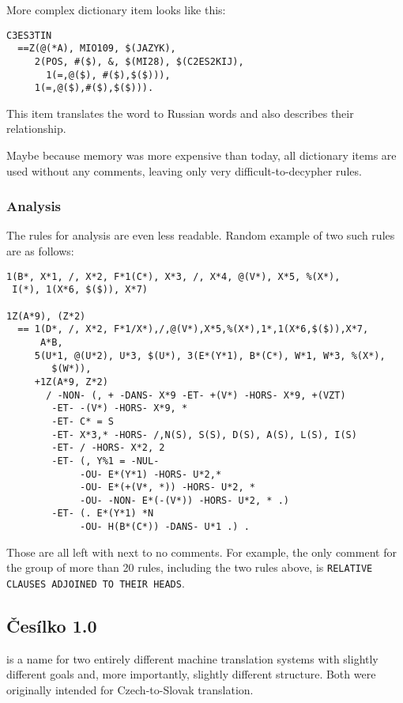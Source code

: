 More complex dictionary item looks like this:
\begin{verbatim}
C3ES3TIN
  ==Z(@(*A), MIO109, $(JAZYK), 
     2(POS, #($), &, $(MI28), $(C2ES2KIJ),
       1(=,@($), #($),$($))),
     1(=,@($),#($),$($))).
\end{verbatim}

This item translates the word  to Russian words  and also describes their relationship.

Maybe because memory was more expensive than today, all dictionary items are used without any comments, leaving only very difficult-to-decypher rules.
\subsubsection{Analysis}

The rules for analysis are even less readable. Random example of two such rules are as follows:

\begin{verbatim}
1(B*, X*1, /, X*2, F*1(C*), X*3, /, X*4, @(V*), X*5, %(X*),
 I(*), 1(X*6, $($)), X*7)

1Z(A*9), (Z*2)
  == 1(D*, /, X*2, F*1/X*),/,@(V*),X*5,%(X*),1*,1(X*6,$($)),X*7,
      A*B,
     5(U*1, @(U*2), U*3, $(U*), 3(E*(Y*1), B*(C*), W*1, W*3, %(X*), 
        $(W*)),
     +1Z(A*9, Z*2)
       / -NON- (, + -DANS- X*9 -ET- +(V*) -HORS- X*9, +(VZT)
        -ET- -(V*) -HORS- X*9, *
        -ET- C* = S
        -ET- X*3,* -HORS- /,N(S), S(S), D(S), A(S), L(S), I(S)
        -ET- / -HORS- X*2, 2
        -ET- (, Y%1 = -NUL-
             -OU- E*(Y*1) -HORS- U*2,*
             -OU- E*(+(V*, *)) -HORS- U*2, *
             -OU- -NON- E*(-(V*)) -HORS- U*2, * .)
        -ET- (. E*(Y*1) *N
             -OU- H(B*(C*)) -DANS- U*1 .) .
\end{verbatim}

Those are all left with next to no comments. For example, the only comment for the group of more than 20 rules, including the two rules above, is \texttt{RELATIVE CLAUSES ADJOINED TO THEIR HEADS}.

\subsection{Česílko 1.0}
\label{cesilko10}

 is a name for two entirely different machine translation systems with slightly different goals and, more importantly, slightly different structure. Both were originally intended for Czech-to-Slovak translation.

